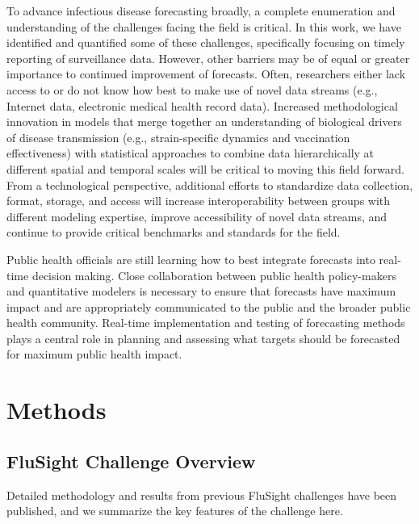 \documentclass{article}\usepackage[]{graphicx}\usepackage[]{color}
\begin{document}
To advance infectious disease forecasting broadly, a complete enumeration and understanding of the challenges facing the field is critical.
In this work, we have identified and quantified some of these challenges, specifically focusing on timely reporting of surveillance data. 
However, other barriers may be of equal or greater importance to continued improvement of forecasts.
Often, researchers either lack access to or do not know how best to make use of novel data streams (e.g., Internet data, electronic medical health record data). 
Increased methodological innovation in models that merge together an understanding of biological drivers of disease transmission (e.g., strain-specific dynamics and vaccination effectiveness) with statistical approaches to combine data hierarchically at different spatial and temporal scales will be critical to moving this field forward.
From a technological perspective, additional efforts to standardize data collection, format, storage, and access will increase interoperability between groups with different modeling expertise, improve accessibility of novel data streams, and continue to provide critical benchmarks and standards for the field.

Public health officials are still learning how to best integrate forecasts into real-time decision making.
Close collaboration between public health policy-makers and quantitative modelers is necessary to ensure that forecasts have maximum impact and are appropriately communicated to the public and the broader public health community. 
Real-time implementation and testing of forecasting methods plays a central role in planning and assessing what targets should be forecasted for maximum public health impact.

\section*{Methods}

\subsection*{FluSight Challenge Overview}
 
Detailed methodology and results from previous FluSight challenges have been published\cite{Biggerstaff2016,Biggerstaff2018}, and we summarize the key features of the challenge here.
\end{document}
